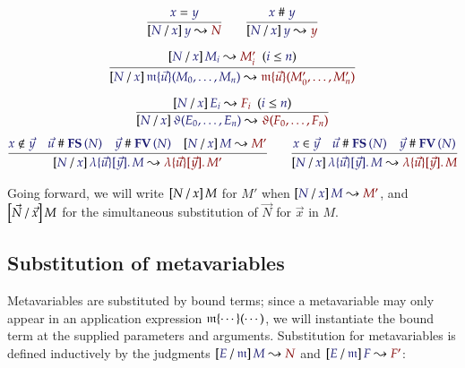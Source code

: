 \documentclass[11pt]{article}
\theoremstyle{definition}
\theoremstyle{remark}
\numberwithin{equation}{section}
\begin{document}
\begin{gather*}
  \infer{
    \IsSubst{N}{x}{y}{N}
  }{
    \IsEq{x}{y}
  }
\qquad
  \infer{
    \IsSubst{N}{x}{y}{y}
  }{
    \IsApart{x}{y}
  }
\\[6pt]
  \infer{
    \IsSubst{N}{x}{
      \MApp{\MV{m}}{\vec{u}}{M_0,\dots,M_n}
    }{
      \MApp{\MV{m}}{\vec{u}}{M'_0,\dots,M'_n}
    }
  }{
    \HypJ{
      \IsSubst{N}{x}{M_i}{M'_i}
    }{
      \Leq{i}{n}
    }
  }
\\[6pt]
  \infer{
    \IsSubst{N}{x}{
      \App{\vartheta}{E_0,\dots,E_n}
    }{
      \App{\vartheta}{F_0,\dots,F_n}
    }
  }{
    \HypJ{
      \IsSubst{N}{x}{E_i}{F_i}
    }{
      \Leq{i}{n}
    }
  }
\end{gather*}
\begin{gather*}
  \infer{
    \IsSubst{N}{x}{
      \MkBTm{\vec{u}}{\vec{y}}{M}
    }{
      \MkBTm{\vec{u}}{\vec{y}}{M'}
    }
  }{
    \NotIn{x}{\vec{y}}
&
    \IsApart{\vec{u}}{\FS{N}}
&
    \IsApart{\vec{y}}{\FV{N}}
&
    \IsSubst{N}{x}{M}{M'}
  }
\qquad
  \infer{
    \IsSubst{N}{x}{
      \MkBTm{\vec{u}}{\vec{y}}{M}
    }{
      \MkBTm{\vec{u}}{\vec{y}}{M}
    }
  }{
    \Member{x}{\vec{y}}
&
    \IsApart{\vec{u}}{\FS{N}}
&
    \IsApart{\vec{y}}{\FV{N}}
  }
\end{gather*}

Going forward, we will write $\left[N\, /\, x\right]M$ for $M'$ when
$\IsSubst{N}{x}{M}{M'}$, and $\left[\vec{N}\, /\, \vec{x}\right]M$ for the simultaneous
substitution of $\vec{N}$ for $\vec{x}$ in $M$.

\subsection{Substitution of metavariables}

Metavariables are substituted by bound terms; since a metavariable may only
appear in an application expression $\mathfrak{m}\{\cdots\}(\cdots)$, we will
instantiate the bound term at the supplied parameters and arguments.
Substitution for metavariables is defined inductively by the judgments
$\IsSubst{E}{\MV{m}}{M}{N}$ and $\IsSubst{E}{\MV{m}}{F}{F'}$:
\end{document}
